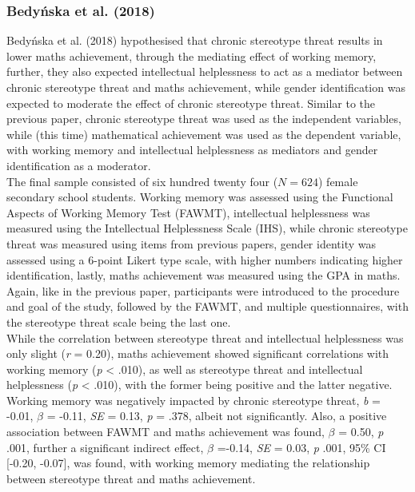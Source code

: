 \documentclass[
  stu,floatsintext]{apa7}
\begin{document}
\subsubsection{Bedyńska et al. (2018)}\label{bedynskachronicstereotypethreat2018}

Bedyńska et al. (2018) hypothesised that chronic stereotype threat results in lower maths achievement, through the mediating effect of working memory, further, they also expected intellectual helplessness to act as a mediator between chronic stereotype threat and maths achievement, while gender identification was expected to moderate the effect of chronic stereotype threat.
Similar to the previous paper, chronic stereotype threat was used as the independent variables, while (this time) mathematical achievement was used as the dependent variable, with working memory and intellectual helplessness as mediators and gender identification as a moderator.\\
The final sample consisted of six hundred twenty four (\(N=624\)) female secondary school students.
Working memory was assessed using the Functional Aspects of Working Memory Test (FAWMT), intellectual helplessness was measured using the Intellectual Helplessness Scale (IHS), while chronic stereotype threat was measured using items from previous papers, gender identity was assessed using a 6-point Likert type scale, with higher numbers indicating higher identification, lastly, maths achievement was measured using the GPA in maths.\\
Again, like in the previous paper, participants were introduced to the procedure and goal of the study, followed by the FAWMT, and multiple questionnaires, with the stereotype threat scale being the last one.\\
While the correlation between stereotype threat and intellectual helplessness was only slight (\emph{r} = 0.20), maths achievement showed significant correlations with working memory (\emph{p} \textless{} .010), as well as stereotype threat and intellectual helplessness (\emph{p} \textless{} .010), with the former being positive and the latter negative.
Working memory was negatively impacted by chronic stereotype threat, \emph{b} = -0.01, \(\beta\) = -0.11, \emph{SE} = 0.13, \emph{p} = .378, albeit not significantly.
Also, a positive association between FAWMT and maths achievement was found, \(\beta\) = 0.50, \emph{p} .001, further a significant indirect effect, \(\beta\) =-0.14, \emph{SE} = 0.03, \emph{p} .001, 95\% CI {[}-0.20, -0.07{]}, was found, with working memory mediating the relationship between stereotype threat and maths achievement.
\end{document}
